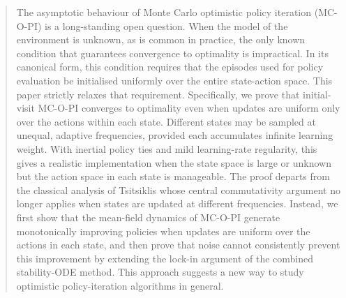 \documentclass[twoside,11pt]{article}
\begin{document}
\begin{abstract}%




















































The asymptotic behaviour of Monte Carlo optimistic policy iteration (MC-O-PI) is a long-standing open question. When the model of the environment is unknown, as is common in practice, the only known condition that guarantees convergence to optimality is impractical. In its canonical form, this condition requires that the episodes used for policy evaluation be initialised uniformly over the entire state-action space. This paper strictly relaxes that requirement. Specifically, we prove that initial-visit MC-O-PI converges to optimality even when updates are uniform only over the actions within each state. Different states may be sampled at unequal, adaptive frequencies, provided each accumulates infinite learning weight. With inertial policy ties and mild learning-rate regularity, this gives a realistic implementation when the state space is large or unknown but the action space in each state is manageable. The proof departs from the classical analysis of Tsitsiklis whose central commutativity argument no longer applies when states are updated at different frequencies. Instead, we first show that the mean-field dynamics of MC-O-PI generate monotonically improving policies when updates are uniform over the actions in each state, and then prove that noise cannot consistently prevent this improvement by extending the lock-in argument of the combined stability-ODE method. This approach suggests a new way to study optimistic policy-iteration algorithms in general.
\end{abstract}
\end{document}
